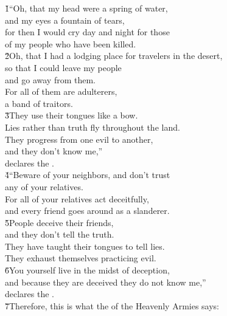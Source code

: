 \begin{poetry}
\poeml {}
\v{1}``Oh, that my head were a spring of water, \\
\poeml and my eyes a fountain of tears, \\
\poeml for then I would cry day and night for those \\
\poemll    of my people who have been killed. \\
\poeml \v{2}Oh, that I had a lodging place for travelers in the desert, \\
\poemll    so that I could leave my people \\
\poemlll       and go away from them. \\
\poeml For all of them are adulterers, \\
\poemll    a band of traitors. \\
\poeml \v{3}They use their tongues like a bow. \\
\poemll    Lies rather than truth fly throughout the land. \\
\poeml They progress from one evil to another, \\
\poemll    and they don't know me,'' \\
\poemlll       declares the . \\
\poeml \v{4}``Beware of your neighbors, and don't trust \\
\poemll    any of your relatives. \\
\poeml For all of your relatives act deceitfully, \\
\poemll    and every friend goes around as a slanderer. \\
\poeml \v{5}People deceive their friends, \\
\poemll    and they don't tell the truth. \\
\poeml They have taught their tongues to tell lies. \\
\poemll    They exhaust themselves practicing evil. \\
\poeml \v{6}You yourself live in the midst of deception, \\
\poemll    and because they are deceived they do not know me,'' \\
\poemlll       declares the . \\
\poeml \v{7}Therefore, this is what the  of the Heavenly Armies says:
\end{poetry}


